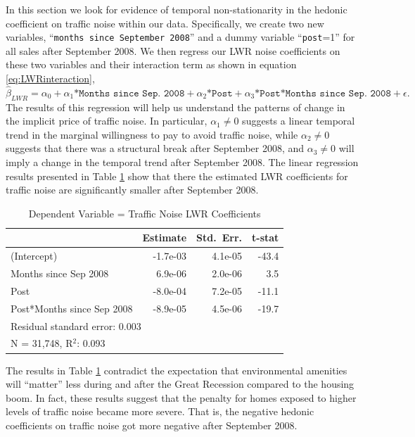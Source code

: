 \documentclass{article}\usepackage{graphicx, color}
\begin{document}
In this section we look for evidence of temporal non-stationarity in the hedonic coefficient on traffic noise within our data. Specifically, we create two new variables, ``\texttt{months since September 2008}'' and a dummy variable ``\texttt{post}=1'' for all sales after September 2008. We then regress our LWR noise coefficients on these two variables and their interaction term as shown in equation \eqref{eq:LWRinteraction}, 
\begin{equation}\label{eq:LWRinteraction}
\hat{\beta}_{LWR} = \alpha _0 + \alpha _1 \texttt{*Months since Sep. 2008} + \alpha _2  \texttt{*Post} + \alpha _3 \texttt{*Post*Months since Sep. 2008} + \epsilon.
\end{equation}
The results of this regression will help us understand the patterns of change in the implicit price of traffic noise. In particular, $\alpha_1 \neq 0$ suggests a linear temporal trend in the marginal willingness to pay to avoid traffic noise, while $\alpha_2 \neq 0$ suggests that there was a structural break after September 2008, and $\alpha_3 \neq 0$ will imply a change in the temporal trend after September 2008. The linear regression results presented in Table \ref{tab:betaMAX} show that there the estimated LWR coefficients for traffic noise are significantly smaller after September 2008.
\begin{table}[htb]
\caption{Dependent Variable = Traffic Noise LWR Coefficients}\label{tab:betaMAX}
\begin{center}
\begin{tabular}{lrrr}
           & Estimate & Std.\ Err. & t-stat  \\  \hline
(Intercept) & -1.7e-03 &  4.1e-05 &  -43.4   \\
Months since Sep 2008       & 6.9e-06 &  2.0e-06  &   3.5    \\
Post        &-8.0e-04 &  7.2e-05  & -11.1    \\
Post*Months since Sep 2008  &-8.9e-05 &  4.5e-06  & -19.7    \\ \hline
\multicolumn{4}{l}{Residual standard error: 0.003} \\
\multicolumn{4}{l}{N = 31,748, R$^2$: 0.093} \\ %
\end{tabular}
\end{center}
\end{table}

The results in Table \ref{tab:betaMAX} contradict the expectation that environmental amenities will ``matter'' less during and after the Great Recession compared to the housing boom. In fact, these results suggest that the penalty for homes exposed to higher levels of traffic noise became more severe. That is, the negative hedonic coefficients on traffic noise got more negative after September 2008.  
\end{document}
